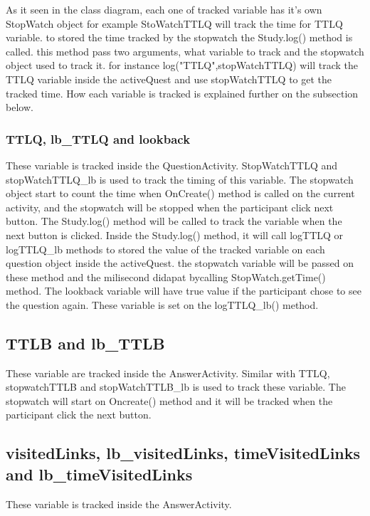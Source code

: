 
As it seen in the class diagram, each one of tracked variable has it's own StopWatch object for example StoWatchTTLQ will track the time for TTLQ variable. to stored the time tracked by the stopwatch the Study.log() method is called. this method pass two arguments, what variable to track and the stopwatch object used to track it. for instance log("TTLQ",stopWatchTTLQ) will track the TTLQ variable inside the activeQuest and use stopWatchTTLQ to get the tracked time.
How each variable is tracked is explained further on the subsection below.

\subsubsection{TTLQ, lb\_TTLQ and lookback}
These variable is tracked inside the QuestionActivity. StopWatchTTLQ and stopWatchTTLQ\_lb is used to track the timing of this variable. The stopwatch object start to count the time when OnCreate() method is called on the current activity, and the stopwatch will be stopped when the participant click next button. The Study.log() method will be called to track the variable when the next button is clicked. Inside the Study.log() method, it will call logTTLQ or logTTLQ\_lb methods to stored the value of the tracked variable on each question object inside the activeQuest. the stopwatch variable will be passed on these method and the milisecond didapat bycalling StopWatch.getTime() method.
The lookback variable will have true value if the participant chose to see the question again. These variable is set on the logTTLQ\_lb() method.

\subsection{TTLB and lb\_TTLB}
These variable are tracked inside the AnswerActivity. Similar with TTLQ, stopwatchTTLB and stopWatchTTLB\_lb is used to track these variable. The stopwatch will start on Oncreate() method and it will be tracked when the participant click the next button.

\subsection{visitedLinks, lb\_visitedLinks, timeVisitedLinks\\ and lb\_timeVisitedLinks}
These variable is tracked inside the AnswerActivity.

